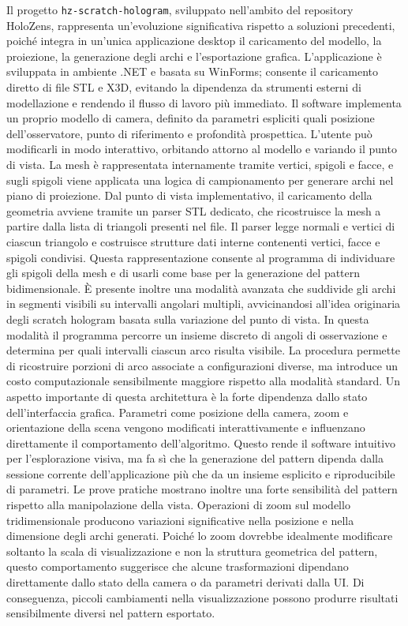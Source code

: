 \documentclass[a4paper,11pt,titlepage,twoside]{book}
\newcommand{\1}{\mathbf{1}}
\numberwithin{equation}{chapter}
\theoremstyle{plain}
\theoremstyle{definition}
\begin{document}
	Il progetto \texttt{hz-scratch-hologram}, sviluppato nell’ambito del repository HoloZens, rappresenta un’evoluzione significativa rispetto a soluzioni precedenti, poiché integra in un’unica applicazione desktop il caricamento del modello, la proiezione, la generazione degli archi e l’esportazione grafica. L’applicazione è sviluppata in ambiente .NET e basata su WinForms; consente il caricamento diretto di file STL e X3D, evitando la dipendenza da strumenti esterni di modellazione e rendendo il flusso di lavoro più immediato.
	Il software implementa un proprio modello di camera, definito da parametri espliciti quali posizione dell’osservatore, punto di riferimento e profondità prospettica. L’utente può modificarli in modo interattivo, orbitando attorno al modello e variando il punto di vista. La mesh è rappresentata internamente tramite vertici, spigoli e facce, e sugli spigoli viene applicata una logica di campionamento per generare archi nel piano di proiezione.
	Dal punto di vista implementativo, il caricamento della geometria avviene tramite un parser STL dedicato, che ricostruisce la mesh a partire dalla lista di triangoli presenti nel file. Il parser legge normali e vertici di ciascun triangolo e costruisce strutture dati interne contenenti vertici, facce e spigoli condivisi. Questa rappresentazione consente al programma di individuare gli spigoli della mesh e di usarli come base per la generazione del pattern bidimensionale.
	È presente inoltre una modalità avanzata che suddivide gli archi in segmenti visibili su intervalli angolari multipli, avvicinandosi all’idea originaria degli scratch hologram basata sulla variazione del punto di vista. In questa modalità il programma percorre un insieme discreto di angoli di osservazione e determina per quali intervalli ciascun arco risulta visibile. La procedura permette di ricostruire porzioni di arco associate a configurazioni diverse, ma introduce un costo computazionale sensibilmente maggiore rispetto alla modalità standard.
	Un aspetto importante di questa architettura è la forte dipendenza dallo stato dell’interfaccia grafica. Parametri come posizione della camera, zoom e orientazione della scena vengono modificati interattivamente e influenzano direttamente il comportamento dell’algoritmo. Questo rende il software intuitivo per l’esplorazione visiva, ma fa sì che la generazione del pattern dipenda dalla sessione corrente dell’applicazione più che da un insieme esplicito e riproducibile di parametri.
	Le prove pratiche mostrano inoltre una forte sensibilità del pattern rispetto alla manipolazione della vista. Operazioni di zoom sul modello tridimensionale producono variazioni significative nella posizione e nella dimensione degli archi generati. Poiché lo zoom dovrebbe idealmente modificare soltanto la scala di visualizzazione e non la struttura geometrica del pattern, questo comportamento suggerisce che alcune trasformazioni dipendano direttamente dallo stato della camera o da parametri derivati dalla UI. Di conseguenza, piccoli cambiamenti nella visualizzazione possono produrre risultati sensibilmente diversi nel pattern esportato.
	
\end{document}
